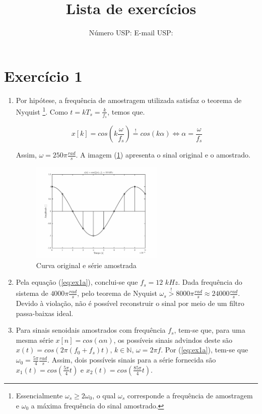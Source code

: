 \documentclass{article}
\title{Lista de exercícios \esnumber}
\author{\studentname \qquad Número USP: \uspid \qquad E-mail USP: \uspmail}
\begin{document}
\maketitle

\section*{Exercício 1}
\begin{enumerate}
\item %

Por hipótese, a frequência de amostragem utilizada satisfaz o teorema de Nyquist \footnote{Essencialmente $\omega_s \geq 2\omega_0$, o qual $\omega_s$ corresponde a frequência de amostragem e $\omega_0$ a máxima frequência do sinal amostrado.}. Como $t = kT_s = \frac{k}{f_s}$, temos que.

\begin{equation}
\label{eq:ex1a}
x[k] = cos(k \frac{\omega}{f_s})  \stackrel{!}{=} cos(k \alpha) \Longleftrightarrow \alpha = \frac{\omega}{f_s}
\end{equation}

Assim, $\omega = 250\pi \frac{rad}{s}$. A imagem (\ref{fig:ex1}) apresenta o sinal original e o amostrado.

\begin{figure}[!h]
	\center
	\includegraphics[width=0.6\textwidth]{./images/ex1a.eps}
	\caption{Curva original e série amostrada}
	\label{fig:ex1}
\end{figure}

\item %
Pela equação (\ref{eq:ex1a}), conclui-se que $f_s = 12$ $kHz$. Dada frequência do sistema de $4000\pi \frac{rad}{s}$, pelo teorema de Nyquist $\omega_s \stackrel{!}{>} 8000\pi \frac{rad}{s} \approx 24000 \frac{rad}{s}$. Devido à violação, não é possível reconstruir o sinal por meio de um filtro passa-baixas ideal. 

\item %
Para sinais senoidais amostrados com frequência $f_s$, tem-se que, para uma mesma série $x[n] = cos(\alpha n)$, os possíveis sinais advindos deste são $x(t) = cos(2 \pi (f_0 + f_s)t) \mbox{, } k \in \mathbb{N} \mbox{, } \omega = 2 \pi f$. Por (\ref{eq:ex1a}), tem-se que $\omega_0 = \frac{5\pi}{4} \frac{rad}{s}$. Assim, dois possíveis sinais para a série fornecida são $x_1(t) = cos(\frac{5\pi}{4} t )$ e $x_2(t) = cos(\frac{85\pi}{4} t)$.


\end{enumerate}
\end{document}
